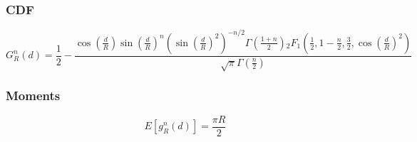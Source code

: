 \subsubsection{CDF}
\begin{equation}
G_{R}^{n}(d)=\frac{1}{2}-\frac{\cos\left(\frac{d}{R}\right) \sin\left(\frac{d}{R}\right)^n \left(\sin\left(\frac{d}{R}\right)^2\right)^{-n/2}\Gamma\left(\frac{1+n}{2}\right) {}_{2}F_{1}\left(\frac{1}{2},1-\frac{n}{2},\frac{3}{2},\cos\left(\frac{d}{R}\right)^2\right) }  {\sqrt{\pi } \Gamma\left(\frac{n}{2}\right)}
\end{equation}

\subsubsection{Moments}

\begin{equation}
E[g_{R}^{n}(d)]=\frac{\pi R}{2}
\end{equation}




